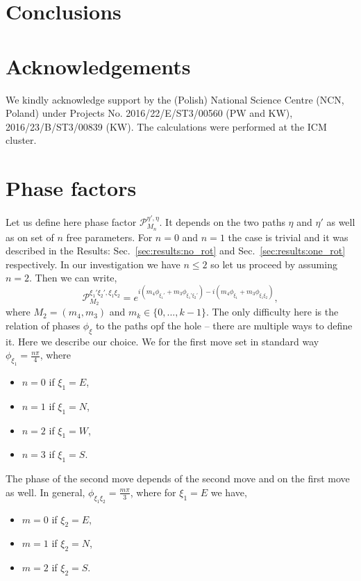\documentclass[%
 reprint,
 amsmath,amssymb,
 aps,
prb,
floatfix,
]{revtex4-1}
\begin{document}
\section{\label{sec:conclusions}Conclusions}

\section*{\label{sec:acknowledgements}Acknowledgements}
We  kindly  acknowledge  support  by  the  (Polish)  National  Science  Centre  (NCN, Poland)  under  Projects  No. 2016/22/E/ST3/00560 (PW and KW), 2016/23/B/ST3/00839 (KW). The calculations were performed at the ICM cluster.


\appendix
\section{\label{sec:appendix:phases}Phase factors}
Let us define here phase factor $\mathcal{P}_{M_n}^{\eta',\eta}$. It depends on the two paths $\eta$ and $\eta'$ as well as on set of $n$ free parameters. For $n = 0$ and $n = 1$ the case is trivial and it was described in the Results: Sec.~\ref{sec:results:no_rot} and Sec.~\ref{sec:results:one_rot} respectively. In our investigation we have $n \leq 2$ so let us proceed by assuming $n = 2$. 
Then we can write,
\begin{equation}
	\mathcal{P}_{M_2}^{\xi_1' \xi_2', \xi_1 \xi_2} = e^{i\left(m_4\phi_{\xi_1'} + m_3\phi_{\xi_1' \xi_2'}\right) - i\left(m_4\phi_{\xi_1} + m_3\phi_{\xi_1 \xi_2}\right)},
\end{equation}
where $M_2 = (m_4, m_3)$ and $m_k \in \{0,...,k-1\}$. The only difficulty here is the relation of phases $\phi_\xi$ to the paths opf the hole -- there are multiple ways to define it. Here we describe our choice. We for the first move set in standard way $\phi_{\xi_1} = \frac{n\pi}{4}$, where
\begin{itemize}	
	\item $n = 0$ if $\xi_1 = E$,
	\item $n = 1$ if $\xi_1 = N$,
	\item $n = 2$ if $\xi_1 = W$,
	\item $n = 3$ if $\xi_1 = S$.
\end{itemize}
The phase of the second move depends of the second move and on the first move as well. In general, $\phi_{\xi_1 \xi_2} = \frac{m\pi}{3}$, where for $\xi_1 = E$ we have,
\begin{itemize}	
	\item $m = 0$ if $\xi_2 = E$,
	\item $m = 1$ if $\xi_2 = N$,
	\item $m = 2$ if $\xi_2 = S$.
\end{itemize}
\end{document}
